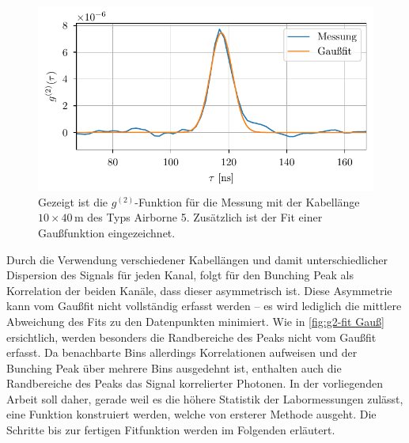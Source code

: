 \begin{figure}[h]
    \centering
    \includegraphics{images/Analysis/g2_gaussfit.pdf}
    \caption{Gezeigt ist die $g^{(2)}$-Funktion für die Messung mit der Kabellänge $10 \times 40$\,m des Typs Airborne 5. Zusätzlich ist der Fit einer Gaußfunktion eingezeichnet.}
    \label{fig:g2-fit Gauß}
\end{figure}
Durch die Verwendung verschiedener Kabellängen und damit unterschiedlicher Dispersion des Signals für jeden Kanal, folgt für den Bunching Peak als Korrelation der beiden Kanäle, dass dieser asymmetrisch ist. 
Diese Asymmetrie kann vom Gaußfit nicht vollständig erfasst werden -- es wird lediglich die mittlere Abweichung des Fits zu den Datenpunkten minimiert. 
Wie in \autoref{fig:g2-fit Gauß} ersichtlich, werden besonders die Randbereiche des Peaks nicht vom Gaußfit erfasst. 
Da benachbarte Bins allerdings Korrelationen aufweisen und der Bunching Peak über mehrere Bins ausgedehnt ist, enthalten auch die Randbereiche des Peaks das Signal korrelierter Photonen. 
In der vorliegenden Arbeit soll daher, gerade weil es die höhere Statistik der Labormessungen zulässt, eine Funktion konstruiert werden, welche von ersterer Methode ausgeht. 
Die Schritte bis zur fertigen Fitfunktion werden im Folgenden erläutert.

